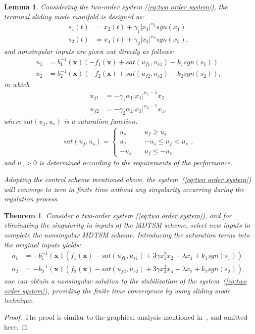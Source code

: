 \documentclass[3p]{elsarticle}
\theoremstyle{plain}
\newtheorem{mylem}{Lemma}
\newtheorem{mythm}{Theorem}
\theoremstyle{remark}
\begin{document}
\begin{mylem}\label{lemma:3}
Considering the two-order system (\ref{eq:two order system}), the terminal sliding mode manifold is designed as:
\begin{align*}
s_1(t) &= x_2(t)+\gamma_1\vert x_1\vert^{\alpha_1}sgn(x_1)\\
s_2(t) &= x_4(t)+\gamma_2\vert x_3\vert^{\alpha_2}sgn(x_3),
\end{align*}
and nonsingular inputs are given out directly as follows:
\begin{align*}
u_1 &= b^{-1}_1(\bm x)(-f_1(\bm x)+sat(u_{f1},u_{s1})-k_1sgn(s_1))\\
u_2 &= b^{-1}_2(\bm x)(-f_2(\bm x)+sat(u_{f2},u_{s2})-k_2sgn(s_2)),
\end{align*}
in which
\begin{align*}
u_{f1}&=-\gamma_1\alpha_1\vert x_1\vert^{\alpha_1-1}x_2\\
u_{f2}&=-\gamma_2\alpha_2\vert x_3\vert^{\alpha_2-1}x_4,
\end{align*}
where $sat(u_f,u_s)$ is a saturation function:
\begin{align}
sat(u_f,u_s)=
\begin{cases}
u_s\quad &u_f\ge u_s\\
u_f\quad &-u_s\le u_f< u_s\\
-u_s\quad &u_f\le -u_s
\end{cases},
\end{align}
and $u_s>0$ is determined according to the requirements of the performance.\par
Adopting the control scheme mentioned above, the system~(\ref{eq:two order system}) will converge to zero in finite time without any singularity occurring during the regulation process.
\end{mylem}
\begin{mythm}\label{theorem:3}
Consider a two-order system (\ref{eq:two order system}), and for eliminating the singularity in inputs of the MDTSM scheme, select new inputs to complete the nonsingular MDTSM scheme. Introducing the saturation terms into the original inputs yields:
\begin{align}
u_1 &= -b_1^{-1}(\bm x)(f_1(\bm x)-sat(u_{f1},u_{s1})+3\gamma x_1^2x_2-\lambda x_4+k_1sgn(s_1))\\
u_2 &= -b_2^{-1}(\bm x)(f_2(\bm x)-sat(u_{f2},u_{s2})+3\gamma x_3^2x_4+\lambda x_2+k_2sgn(s_2)),\label{eq:nonsingular modified input}
\end{align}
one can obtain a nonsingular solution to the stabilization of the system~(\ref{eq:two order system}), providing the finite time convergence by using sliding mode technique.
\end{mythm}
\begin{proof}
The proof is similar to the graphical analysis mentioned in~\cite{feng2013nonsingular}, and omitted here.
\end{proof}
\end{document}
